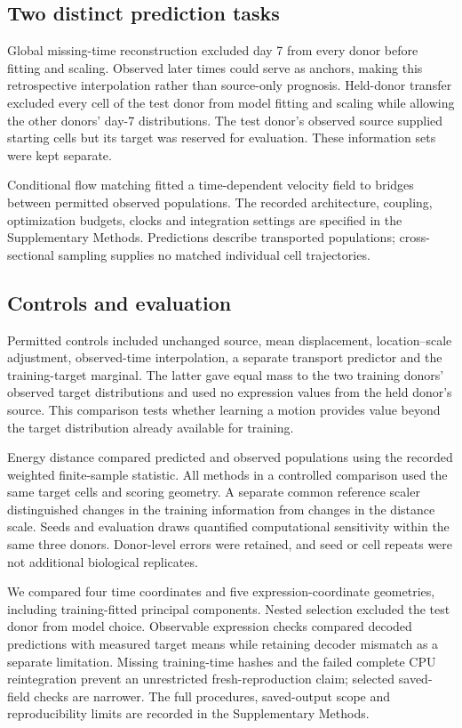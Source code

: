\documentclass[10pt,a4paper]{article}
\begin{document}
\subsection{Two distinct prediction tasks}
Global missing-time reconstruction excluded day 7 from every donor before fitting and scaling. Observed later times could serve as anchors, making this retrospective interpolation rather than source-only prognosis. Held-donor transfer excluded every cell of the test donor from model fitting and scaling while allowing the other donors' day-7 distributions. The test donor's observed source supplied starting cells but its target was reserved for evaluation. These information sets were kept separate.

Conditional flow matching fitted a time-dependent velocity field to bridges between permitted observed populations. The recorded architecture, coupling, optimization budgets, clocks and integration settings are specified in the Supplementary Methods. Predictions describe transported populations; cross-sectional sampling supplies no matched individual cell trajectories.

\subsection{Controls and evaluation}
Permitted controls included unchanged source, mean displacement, location--scale adjustment, observed-time interpolation, a separate transport predictor and the training-target marginal. The latter gave equal mass to the two training donors' observed target distributions and used no expression values from the held donor's source. This comparison tests whether learning a motion provides value beyond the target distribution already available for training.

Energy distance compared predicted and observed populations using the recorded weighted finite-sample statistic. All methods in a controlled comparison used the same target cells and scoring geometry. A separate common reference scaler distinguished changes in the training information from changes in the distance scale. Seeds and evaluation draws quantified computational sensitivity within the same three donors. Donor-level errors were retained, and seed or cell repeats were not additional biological replicates.

We compared four time coordinates and five expression-coordinate geometries, including training-fitted principal components. Nested selection excluded the test donor from model choice. Observable expression checks compared decoded predictions with measured target means while retaining decoder mismatch as a separate limitation. Missing training-time hashes and the failed complete CPU reintegration prevent an unrestricted fresh-reproduction claim; selected saved-field checks are narrower. The full procedures, saved-output scope and reproducibility limits are recorded in the Supplementary Methods.
\end{document}
